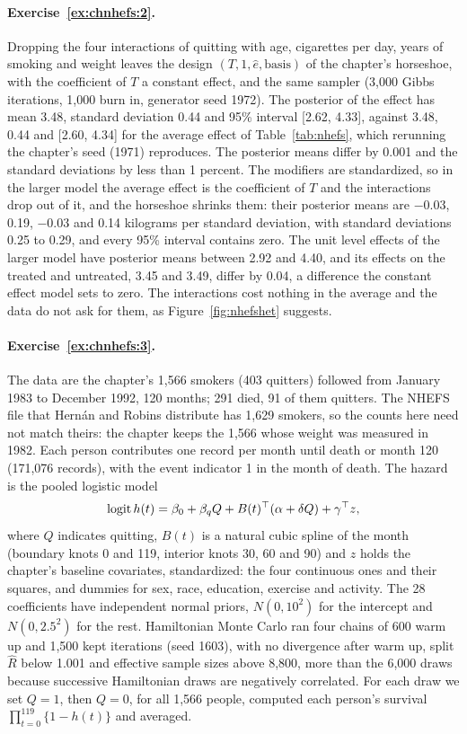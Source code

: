 \paragraph{Exercise~\ref{ex:chnhefs:2}.} Dropping the four interactions of quitting with age, cigarettes per day, years of smoking and weight leaves the design $(T, 1, \hat e, \text{basis})$ of the chapter's horseshoe, with the coefficient of $T$ a constant effect, and the same sampler (3,000 Gibbs iterations, 1,000 burn in, generator seed 1972). The posterior of the effect has mean 3.48, standard deviation 0.44 and 95\% interval [2.62, 4.33], against 3.48, 0.44 and [2.60, 4.34] for the average effect of Table~\ref{tab:nhefs}, which rerunning the chapter's seed (1971) reproduces. The posterior means differ by 0.001 and the standard deviations by less than 1 percent. The modifiers are standardized, so in the larger model the average effect is the coefficient of $T$ and the interactions drop out of it, and the horseshoe shrinks them: their posterior means are $-0.03$, 0.19, $-0.03$ and 0.14 kilograms per standard deviation, with standard deviations 0.25 to 0.29, and every 95\% interval contains zero. The unit level effects of the larger model have posterior means between 2.92 and 4.40, and its effects on the treated and untreated, 3.45 and 3.49, differ by 0.04, a difference the constant effect model sets to zero. The interactions cost nothing in the average and the data do not ask for them, as Figure~\ref{fig:nhefshet} suggests.

\paragraph{Exercise~\ref{ex:chnhefs:3}.} The data are the chapter's 1,566 smokers (403 quitters) followed from January 1983 to December 1992, 120 months; 291 died, 91 of them quitters. The NHEFS file that Hern\'an and Robins distribute has 1,629 smokers, so the counts here need not match theirs: the chapter keeps the 1,566 whose weight was measured in 1982. Each person contributes one record per month until death or month 120 (171,076 records), with the event indicator 1 in the month of death. The hazard is the pooled logistic model
\[
\operatorname{logit} h(t) = \beta_0 + \beta_q Q + B(t)^\top(\alpha + \delta Q) + \gamma^\top z,
\]
where $Q$ indicates quitting, $B(t)$ is a natural cubic spline of the month (boundary knots 0 and 119, interior knots 30, 60 and 90) and $z$ holds the chapter's baseline covariates, standardized: the four continuous ones and their squares, and dummies for sex, race, education, exercise and activity. The 28 coefficients have independent normal priors, $N(0, 10^2)$ for the intercept and $N(0, 2.5^2)$ for the rest. Hamiltonian Monte Carlo ran four chains of 600 warm up and 1,500 kept iterations (seed 1603), with no divergence after warm up, split $\hat R$ below 1.001 and effective sample sizes above 8,800, more than the 6,000 draws because successive Hamiltonian draws are negatively correlated. For each draw we set $Q = 1$, then $Q = 0$, for all 1,566 people, computed each person's survival $\prod_{t=0}^{119}\{1 - h(t)\}$ and averaged.

